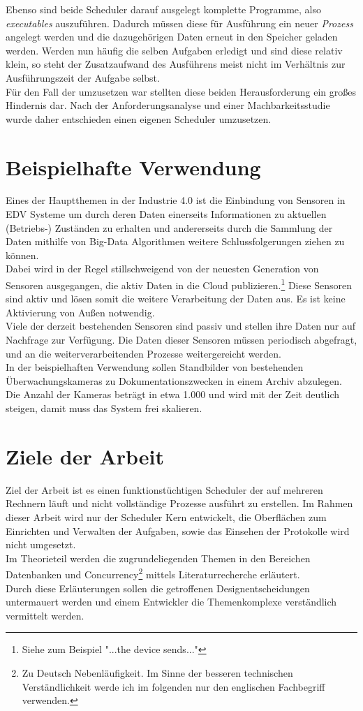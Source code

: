 Ebenso sind beide Scheduler darauf ausgelegt komplette Programme, also \emph{executables} auszuführen. Dadurch müssen diese für Ausführung ein neuer \emph{Prozess} angelegt werden und die dazugehörigen Daten erneut in den Speicher geladen werden. Werden nun häufig die selben Aufgaben erledigt und sind diese relativ klein, so steht der Zusatzaufwand des Ausführens meist nicht im Verhältnis zur Ausführungszeit der Aufgabe selbst.\\
Für den Fall der umzusetzen war stellten diese beiden Herausforderung ein großes Hindernis dar. Nach der Anforderungsanalyse und einer Machbarkeitsstudie wurde daher entschieden einen eigenen Scheduler umzusetzen.

\section{Beispielhafte Verwendung}
Eines der Hauptthemen in der Industrie 4.0 ist die Einbindung von Sensoren in EDV Systeme um durch deren Daten einerseits Informationen zu aktuellen (Betriebs-) Zuständen zu erhalten und andererseits durch die Sammlung der Daten mithilfe von Big-Data Algorithmen weitere Schlussfolgerungen ziehen zu können.\parencite[S. 36ff]{Manzei2015}\\
Dabei wird in der Regel stillschweigend von der neuesten Generation von Sensoren ausgegangen, die aktiv Daten in die Cloud publizieren.\footnote{Siehe zum Beispiel \parencite{ms_azureiot} "...the device sends..."} Diese Sensoren sind aktiv und lösen somit die weitere Verarbeitung der Daten aus. Es ist keine Aktivierung von Außen notwendig.\\
Viele der derzeit bestehenden Sensoren sind passiv und stellen ihre Daten nur auf Nachfrage zur Verfügung. Die Daten dieser Sensoren müssen periodisch abgefragt, und an die weiterverarbeitenden Prozesse weitergereicht werden.\\
In der beispielhaften Verwendung sollen Standbilder von bestehenden Überwachungskameras zu Dokumentationszwecken in einem Archiv abzulegen. Die Anzahl der Kameras beträgt in etwa 1.000 und wird mit der Zeit deutlich steigen, damit muss das System frei skalieren.\\ 
\section{Ziele der Arbeit}
Ziel der Arbeit ist es einen funktionstüchtigen Scheduler der auf mehreren Rechnern läuft und nicht vollständige Prozesse ausführt zu erstellen. Im Rahmen dieser Arbeit wird nur der Scheduler Kern entwickelt, die Oberflächen zum Einrichten und Verwalten der Aufgaben, sowie das Einsehen der Protokolle wird nicht umgesetzt.
\\Im Theorieteil werden die zugrundeliegenden Themen in den Bereichen Datenbanken und Concurrency\footnote{Zu Deutsch Nebenläufigkeit. Im Sinne der besseren technischen Verständlichkeit werde ich im folgenden nur den englischen Fachbegriff verwenden.} mittels Literaturrecherche erläutert.
\\ Durch diese Erläuterungen sollen die getroffenen Designentscheidungen untermauert werden und einem Entwickler die Themenkomplexe verständlich vermittelt werden.

